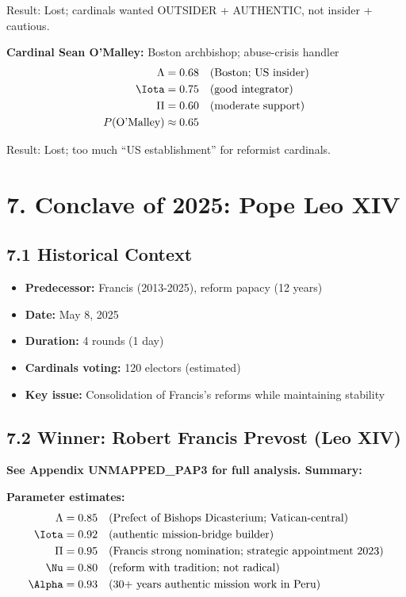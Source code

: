Result: Lost; cardinals wanted OUTSIDER + AUTHENTIC, not insider + cautious.

\textbf{Cardinal Sean O'Malley:} Boston archbishop; abuse-crisis handler
\begin{align*}
\Lambda &= 0.68 \quad \text{(Boston; US insider)} \\
\Iota &= 0.75 \quad \text{(good integrator)} \\
\Pi &= 0.60 \quad \text{(moderate support)} \\
P(\text{O'Malley}) &\approx 0.65
\end{align*}

Result: Lost; too much ``US establishment'' for reformist cardinals.

\section{7. Conclave of 2025: Pope Leo XIV}

\subsection{7.1 Historical Context}

\begin{itemize}
\item \textbf{Predecessor:} Francis (2013-2025), reform papacy (12 years)
\item \textbf{Date:} May 8, 2025
\item \textbf{Duration:} 4 rounds (1 day)
\item \textbf{Cardinals voting:} 120 electors (estimated)
\item \textbf{Key issue:} Consolidation of Francis's reforms while maintaining stability
\end{itemize}

\subsection{7.2 Winner: Robert Francis Prevost (Leo XIV)}

\textbf{See Appendix UNMAPPED_PAP3 for full analysis. Summary:}

\textbf{Parameter estimates:}
\begin{align*}
\Lambda &= 0.85 \quad \text{(Prefect of Bishops Dicasterium; Vatican-central)} \\
\Iota &= 0.92 \quad \text{(authentic mission-bridge builder)} \\
\Pi &= 0.95 \quad \text{(Francis strong nomination; strategic appointment 2023)} \\
\Nu &= 0.80 \quad \text{(reform with tradition; not radical)} \\
\Alpha &= 0.93 \quad \text{(30+ years authentic mission work in Peru)}
\end{align*}

